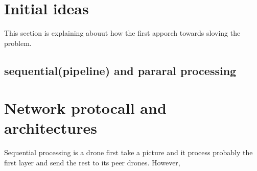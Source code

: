 \documentclass[HSHL, BachelorThesis]{teamhenkler}
\begin{document}
\section{Initial ideas}
This section is explaining abouut how the first apporch towards sloving the problem.
\subsection{sequential(pipeline) and pararal processing}

\section{Network protocall and architectures}
Sequential processing is a drone first take a picture and it process probably the first layer and send the rest to its peer drones. However, 






 

\appendix


\end{document}

